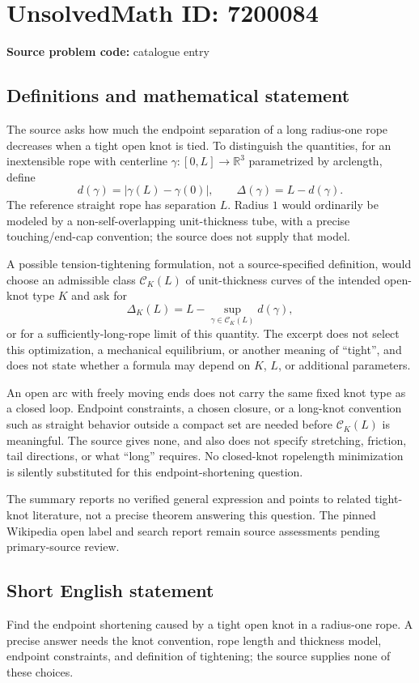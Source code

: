 \documentclass[11pt]{article}
\begin{document}
\section*{UnsolvedMath ID: 7200084}
\textbf{Source problem code:} catalogue entry
\subsection{Definitions and mathematical statement}
The source asks how much the endpoint separation of a long radius-one rope decreases when a tight open knot is tied. To distinguish the quantities, for an inextensible rope with centerline \(\gamma:[0,L]\to\mathbb R^3\) parametrized by arclength, define
\[
 d(\gamma)=|\gamma(L)-\gamma(0)|,\qquad
 \Delta(\gamma)=L-d(\gamma).
\]
The reference straight rope has separation \(L\). Radius \(1\) would ordinarily be modeled by a non-self-overlapping unit-thickness tube, with a precise touching/end-cap convention; the source does not supply that model.

A possible tension-tightening formulation, not a source-specified definition, would choose an admissible class \(\mathcal C_K(L)\) of unit-thickness curves of the intended open-knot type \(K\) and ask for
\[
 \Delta_K(L)=L-\sup_{\gamma\in\mathcal C_K(L)}d(\gamma),
\]
or for a sufficiently-long-rope limit of this quantity. The excerpt does not select this optimization, a mechanical equilibrium, or another meaning of ``tight'', and does not state whether a formula may depend on \(K\), \(L\), or additional parameters.

An open arc with freely moving ends does not carry the same fixed knot type as a closed loop. Endpoint constraints, a chosen closure, or a long-knot convention such as straight behavior outside a compact set are needed before \(\mathcal C_K(L)\) is meaningful. The source gives none, and also does not specify stretching, friction, tail directions, or what ``long'' requires. No closed-knot ropelength minimization is silently substituted for this endpoint-shortening question.

The summary reports no verified general expression and points to related tight-knot literature, not a precise theorem answering this question. The pinned Wikipedia open label and search report remain source assessments pending primary-source review.
\subsection{Short English statement}
Find the endpoint shortening caused by a tight open knot in a radius-one rope. A precise answer needs the knot convention, rope length and thickness model, endpoint constraints, and definition of tightening; the source supplies none of these choices.
\end{document}

